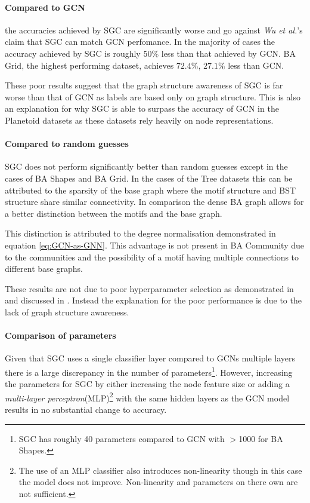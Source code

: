 \paragraph{Compared to GCN}
the accuracies achieved by SGC are significantly worse and go against \textit{Wu et al.}'s claim that SGC can match GCN perfomance.
In the majority of cases the accuracy achieved by SGC is roughly $50\%$ less than that achieved by GCN.
BA Grid, the highest performing dataset, achieves $72.4\%$, $27.1\%$ less than GCN.

These poor results suggest that the graph structure awareness of SGC is far worse than that of GCN as labels are based only on graph structure.
This is also an explanation for why SGC is able to surpass the accuracy of GCN in the Planetoid\cite{kipf2016semi} datasets as these datasets rely heavily on node representations.

\paragraph{Compared to random guesses}
SGC does not perform significantly better than random guesses except in the cases of BA Shapes and BA Grid.
In the cases of the Tree datasets this can be attributed to the sparsity of the base graph where the motif structure and BST structure share similar connectivity.
In comparison the dense BA graph allows for a better distinction between the motifs and the base graph.

This distinction is attributed to the degree normalisation demonstrated in equation \ref{eq:GCN-as-GNN}.
This advantage is not present in BA Community due to the communities and the possibility of a motif having multiple connections to different base graphs.

These results are not due to poor hyperparameter selection as demonstrated in  and discussed in .
Instead the explanation for the poor performance is due to the lack of graph structure awareness.

\paragraph{Comparison of parameters}
Given that SGC uses a single classifier layer compared to GCNs multiple layers there is a large discrepancy in the number of parameters\footnote{SGC has roughly 40 parameters compared to GCN with $>$1000 for BA Shapes.}.
However, increasing the parameters for SGC by either increasing the node feature size or adding a \emph{multi-layer perceptron}(MLP)\footnote{The use of an MLP classifier also introduces non-linearity though in this case the model does not improve. Non-linearity and parameters on there own are not sufficient.} with the same hidden layers as the GCN model results in no substantial change to accuracy.

